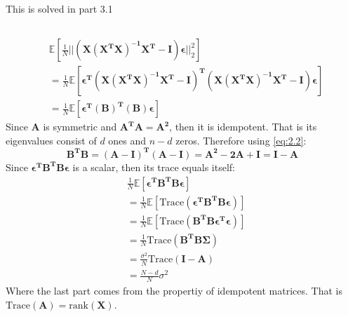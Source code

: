\documentclass[11pt]{scrartcl} %
\begin{document}
\section{} %
		\subsection{}
		This is solved in part 3.1
		\subsection{}
		\begin{equation}
			\begin{aligned} \label{eq:2.2}
				&\mathbb{E}[\frac{1}{N} ||\boldsymbol{ (X(X^T X)^{-1}X^T - I)\epsilon }||_2^2]  \\
				&=\frac{1}{N} \mathbb{E}[\boldsymbol{\epsilon^T (X(X^T X)^{-1}X^T - I)^T (X(X^T X)^{-1}X^T - I) \epsilon }]  \\
				&=\frac{1}{N} \mathbb{E}[\boldsymbol{\epsilon^T (B)^T (B) \epsilon }]
			\end{aligned}
		\end{equation}
		Since $\boldsymbol{A}$ is symmetric and $\boldsymbol{A^T A}=\boldsymbol{A^2}$, then it is idempotent. That is
		its eigenvalues consist of $d$ ones and $n-d$ zeros. Therefore using \ref{eq:2.2}:
		\begin{equation}
			\boldsymbol{B^T B = (A - I)^T (A - I) = A^2 - 2A + I = I - A }  
		\end{equation}
		Since $\boldsymbol{\epsilon^T B^T B \epsilon }$ is a scalar, then its trace equals itself:
		\begin{equation}
			\begin{aligned}
				&\frac{1}{N} \mathbb{E}[\boldsymbol{\epsilon^T B^T B \epsilon }]  \\
				&=\frac{1}{N} \mathbb{E}[\text{Trace}(\boldsymbol{\epsilon^T B^T B \epsilon })]  \\
				&=\frac{1}{N} \mathbb{E}[\text{Trace}(\boldsymbol{ B^T B \epsilon^T \epsilon })]  \\
				&=\frac{1}{N} \text{Trace}(\boldsymbol{ B^T B \Sigma})  \\
				&=\frac{\sigma^2}{N} \text{Trace}(\boldsymbol{I - A})  \\
				&=\frac{N-d}{N} \sigma^2
			\end{aligned}
		\end{equation}
		Where the last part comes from the propertiy of idempotent matrices. That is $\text{Trace}(\boldsymbol{A}) = \text{rank}(\boldsymbol{X})$.
\end{document}
